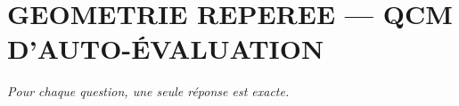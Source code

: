 
\section*{\textcolor{chapcolor}{\MakeUppercase{Geometrie reperee — QCM d'auto-évaluation}}}

\begin{center}
\textit{Pour chaque question, une seule réponse est exacte.}
\end{center}

